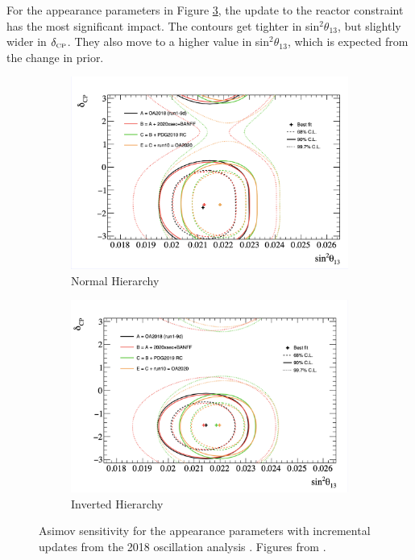 For the appearance parameters in Figure \ref{fig:20182020AppPT}, the update to the reactor constraint has the most significant impact. The contours get tighter in sin$^2\theta_{13}$, but slightly wider in $\delta_{\scriptscriptstyle\mathrm{CP}}$. They also move to a higher value in sin$^2\theta_{13}$, which is expected from the change in prior.

\begin{figure}[!htbp]
\centering
\begin{subfigure}{.7\textwidth}
  \centering
  \includegraphics[width=0.95\linewidth, trim={0.5mm 0.5mm 0mm 0mm}, clip]{figs/jointPTheta_appNH}
  \caption{Normal Hierarchy}
  \label{fig:20182020PTAppNH}
\end{subfigure}
\begin{subfigure}{.7\textwidth}
  \centering
  \includegraphics[width=0.95\linewidth, trim={0mm 0mm 0.5mm 0mm}, clip]{figs/jointPTheta_appIH}
  \caption{Inverted Hierarchy}
  \label{fig:20182020PTAppIH}
\end{subfigure}
\caption{Asimov sensitivity for the appearance parameters with incremental updates from the 2018 oscillation analysis \cite{t2knature}. Figures from \cite{tn397}.}
\label{fig:20182020AppPT}
\end{figure}

